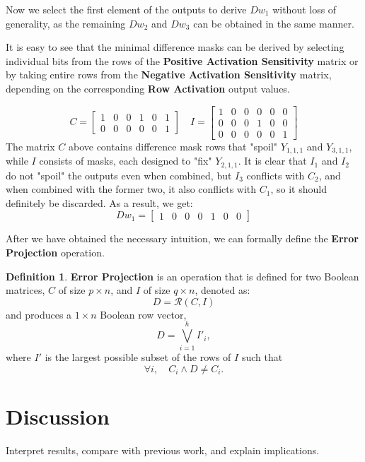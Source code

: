 \documentclass{article}
\theoremstyle{definition}
\newtheorem*{definition}{Definition}
\theoremstyle{remark}
\begin{document}
Now we select the first element of the outputs to derive \( Dw_1 \) without loss of generality, as the remaining \( Dw_2 \) and \( Dw_3 \) can be obtained in the same manner.

It is easy to see that the minimal difference masks can be derived by selecting individual bits from the rows of the \textbf{Positive Activation Sensitivity} matrix or by taking entire rows from the \textbf{Negative Activation Sensitivity} matrix, depending on the corresponding \textbf{Row Activation} output values.

\[
    C = \begin{bmatrix}
        1 & 0 & 0 & 1 & 0 & 1 \\
        0 & 0 & 0 & 0 & 0 & 1
    \end{bmatrix}
    \quad
    I = \begin{bmatrix}
        1 & 0 & 0 & 0 & 0 & 0 \\
        0 & 0 & 0 & 1 & 0 & 0 \\
        0 & 0 & 0 & 0 & 0 & 1
    \end{bmatrix}
\]
The matrix \( C \) above contains difference mask rows that "spoil" \( Y_{1,1,1} \) and \( Y_{3,1,1} \), while \( I \) consists of masks, each designed to "fix" \( Y_{2,1,1} \). It is clear that \( I_1 \) and \( I_2 \) do not "spoil" the outputs even when combined, but \( I_3 \) conflicts with \( C_2 \), and when combined with the former two, it also conflicts with \( C_1 \), so it should definitely be discarded. As a result, we get:
\[
    Dw_1 = \begin{bmatrix} 1 & 0 & 0 & 0 & 1 & 0 & 0 \end{bmatrix}
\]

After we have obtained the necessary intuition, we can formally define the \textbf{Error Projection} operation.

\begin{definition}
    \textbf{Error Projection} is an operation that is defined for two Boolean matrices, \( C \) of size \( p \times n \), and \( I \) of size \( q \times n \), denoted as:
    \[
        D = \mathcal{R}(C, I)
    \]
    and produces a \( 1 \times n \) Boolean row vector,
    \[
        D = \bigvee_{i=1}^{h} I'_{i},
    \]
    where \( I' \) is the largest possible subset of the rows of \( I \) such that
    \[
        \forall i, \quad C_i \wedge D \neq C_i.
    \]
\end{definition}



\section{Discussion}
Interpret results, compare with previous work, and explain implications.
\end{document}
